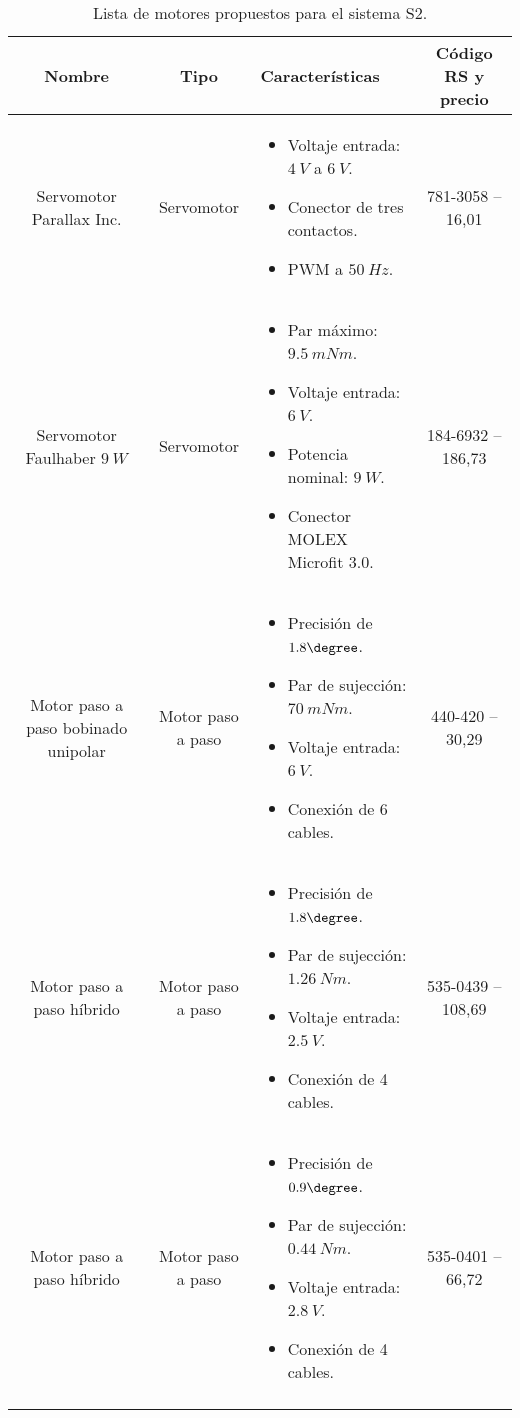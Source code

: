 \begin{longtable}{| C{0.5} | C{0.5} | L{2} | C{1} |}
    \hline
    \textbf{Nombre} & \textbf{Tipo} & \centering\textbf{Características} & \textbf{Código RS y precio} \\
    \hline
    Servomotor Parallax Inc. & Servomotor & 
    \begin{itemize}[leftmargin=*]
        \item Voltaje entrada: $4~V$ a $6~V$.
        \item Conector de tres contactos.
        \item \ac{PWM} a $50~Hz$.
    \end{itemize}
    & 781-3058 -- 16,01\EUR{} \\
    \hline
    Servomotor Faulhaber $9~W$ & Servomotor &
    \begin{itemize}[leftmargin=*]
        \item Par máximo: $9.5~mNm$.
        \item Voltaje entrada: $6~V$.
        \item Potencia nominal: $9~W$.
        \item Conector MOLEX Microfit 3.0.
    \end{itemize}
    & 184-6932 -- 186,73\EUR{} \\
    \hline
    Motor paso a paso bobinado unipolar & Motor paso a paso & 
    \begin{itemize}[leftmargin=*]
        \item Precisión de $1.8\degree$.
        \item Par de sujección: $70~mNm$.
        \item Voltaje entrada: $6~V$.
        \item Conexión de 6 cables.
    \end{itemize}
    & 440-420 -- 30,29\EUR{} \\
    \hline
    Motor paso a paso híbrido & Motor paso a paso &
    \begin{itemize}[leftmargin=*]
        \item Precisión de $1.8\degree$.
        \item Par de sujección: $1.26~Nm$.
        \item Voltaje entrada: $2.5~V$.
        \item Conexión de 4 cables.
    \end{itemize}
    & 535-0439 -- 108,69\EUR{} \\
    \hline
    Motor paso a paso híbrido & Motor paso a paso & 
    \begin{itemize}[leftmargin=*]
        \item Precisión de $0.9\degree$.
        \item Par de sujección: $0.44~Nm$.
        \item Voltaje entrada: $2.8~V$.
        \item Conexión de 4 cables.
    \end{itemize}
    & 535-0401 -- 66,72\EUR{} \\
    \hline
    \caption{Lista de motores propuestos para el sistema \ac{S2}.}
    \label{tab:motor_list}
\end{longtable}